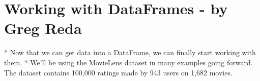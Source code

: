 
\section{Working with DataFrames - by Greg Reda}


*  Now that we can get data into a DataFrame, we can finally start working with them.
*  
We'll be using the MovieLens dataset in many examples going forward. The dataset contains 100,000 ratings made by 943 users on 1,682 movies.


